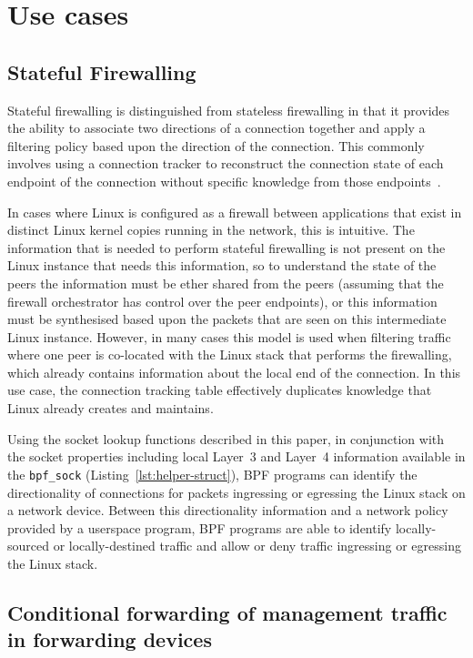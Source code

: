 \documentclass[10pt,sigconf,authorversion]{lpc}
\newcommand\todo[1]{\textcolor{red}{#1}}
\begin{document}

\section{Use cases}

\subsection{Stateful Firewalling}

Stateful firewalling is distinguished from stateless firewalling in that it
provides the ability to associate two directions of a connection together and
apply a filtering policy based upon the direction of the connection. This
commonly involves using a connection tracker to reconstruct the connection
state of each endpoint of the connection without specific knowledge from those
endpoints~\cite{conntrack,ovs-ct}.

In cases where Linux is configured as a firewall between applications that
exist in distinct Linux kernel copies running in the network, this is
intuitive. The information that is needed to perform stateful firewalling is
not present on the Linux instance that needs this information, so to understand
the state of the peers the information must be ether shared from the peers
(assuming that the firewall orchestrator has control over the peer endpoints),
or this information must be synthesised based upon the packets that are seen on
this intermediate Linux instance. However, in many cases this model is used
when filtering traffic where one peer is co-located with the Linux stack that
performs the firewalling, which already contains information about the local
end of the connection. In this use case, the connection tracking table
effectively duplicates knowledge that Linux already creates and maintains.

Using the socket lookup functions described in this paper, in conjunction with
the socket properties including local Layer~3 and Layer~4 information available
in the \verb+bpf_sock+ (Listing~\ref{lst:helper-struct}), BPF programs can
identify the directionality of connections for packets ingressing or egressing
the Linux stack on a network device. Between this directionality information
and a network policy provided by a userspace program, BPF programs are able to
identify locally-sourced or locally-destined traffic and allow or deny traffic
ingressing or egressing the Linux stack.

\subsection{Conditional forwarding of management traffic in forwarding devices}
\end{document}
